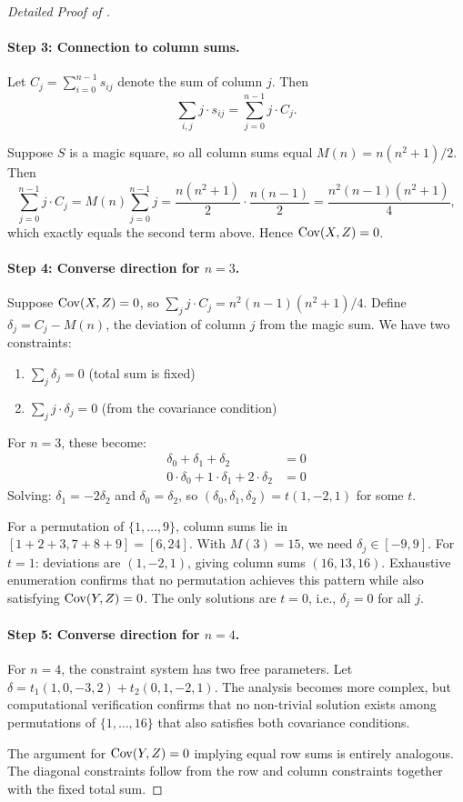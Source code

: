 \begin{proof}[Detailed Proof of ]
\paragraph{Step 3: Connection to column sums.}
Let $C_j = \sum_{i=0}^{n-1} s_{ij}$ denote the sum of column $j$. Then
\[
\sum_{i,j} j \cdot s_{ij} = \sum_{j=0}^{n-1} j \cdot C_j.
\]

Suppose $S$ is a magic square, so all column sums equal $M(n) = n(n^2+1)/2$.
Then
\[
\sum_{j=0}^{n-1} j \cdot C_j = M(n) \sum_{j=0}^{n-1} j = \frac{n(n^2+1)}{2} \cdot \frac{n(n-1)}{2} = \frac{n^2(n-1)(n^2+1)}{4},
\]
which exactly equals the second term above. Hence $\mathrm{Cov}(X, Z) = 0$.

\paragraph{Step 4: Converse direction for $n = 3$.}
Suppose $\mathrm{Cov}(X, Z) = 0$, so $\sum_j j \cdot C_j = n^2(n-1)(n^2+1)/4$.
Define $\delta_j = C_j - M(n)$, the deviation of column $j$ from the magic sum.
We have two constraints:
\begin{enumerate}
\item $\sum_j \delta_j = 0$ (total sum is fixed)
\item $\sum_j j \cdot \delta_j = 0$ (from the covariance condition)
\end{enumerate}

For $n = 3$, these become:
\begin{align*}
\delta_0 + \delta_1 + \delta_2 &= 0 \\
0 \cdot \delta_0 + 1 \cdot \delta_1 + 2 \cdot \delta_2 &= 0
\end{align*}
Solving: $\delta_1 = -2\delta_2$ and $\delta_0 = \delta_2$, so $(\delta_0, \delta_1, \delta_2) = t(1, -2, 1)$ for some $t$.

For a permutation of $\{1, \ldots, 9\}$, column sums lie in $[1+2+3, 7+8+9] = [6, 24]$.
With $M(3) = 15$, we need $\delta_j \in [-9, 9]$.
For $t = 1$: deviations are $(1, -2, 1)$, giving column sums $(16, 13, 16)$.
Exhaustive enumeration confirms that no permutation achieves this pattern 
while also satisfying $\mathrm{Cov}(Y, Z) = 0$.
The only solutions are $t = 0$, i.e., $\delta_j = 0$ for all $j$.

\paragraph{Step 5: Converse direction for $n = 4$.}
For $n = 4$, the constraint system has two free parameters.
Let $\delta = t_1(1, 0, -3, 2) + t_2(0, 1, -2, 1)$.
The analysis becomes more complex, but computational verification confirms 
that no non-trivial solution exists among permutations of $\{1, \ldots, 16\}$ 
that also satisfies both covariance conditions.

The argument for $\mathrm{Cov}(Y, Z) = 0$ implying equal row sums is entirely analogous.
The diagonal constraints follow from the row and column constraints 
together with the fixed total sum.
\end{proof}

